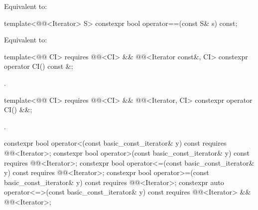 \begin{itemdescr}
\pnum
\effects
Equivalent to: 
\end{itemdescr}

%
\begin{itemdecl}
template<@@<Iterator> S>
  constexpr bool operator==(const S& s) const;
\end{itemdecl}

\begin{itemdescr}
\pnum
\effects
Equivalent to: 
\end{itemdescr}

\begin{itemdecl}
template<@@ CI>
  requires @@<CI> && @@<Iterator const&, CI>
constexpr operator CI() const &;
\end{itemdecl}

\begin{itemdescr}
\pnum
\returns
{}.
\end{itemdescr}

\begin{itemdecl}
template<@@ CI>
  requires @@<CI> && @@<Iterator, CI>
constexpr operator CI() &&;
\end{itemdecl}

\begin{itemdescr}
\pnum
\returns
{}.
\end{itemdescr}

%
%
%
%
%
\begin{itemdecl}
constexpr bool operator<(const basic_const_iterator& y) const
  requires @@<Iterator>;
constexpr bool operator>(const basic_const_iterator& y) const
  requires @@<Iterator>;
constexpr bool operator<=(const basic_const_iterator& y) const
  requires @@<Iterator>;
constexpr bool operator>=(const basic_const_iterator& y) const
  requires @@<Iterator>;
constexpr auto operator<=>(const basic_const_iterator& y) const
  requires @@<Iterator> && @@<Iterator>;
\end{itemdecl}

